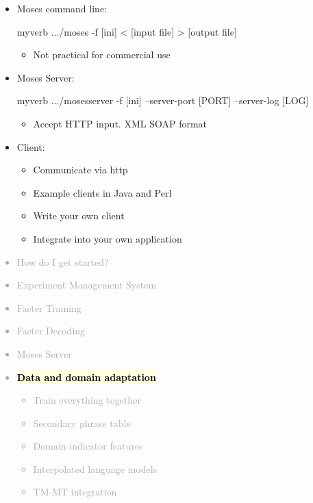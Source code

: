 \documentclass[landscape]{uedslides2C}
\newcommand{\currenttopic}[1]{\colorbox{lightyellow}{\textcolor{black}{\bf #1}}}
\begin{document}
\begin{itemize} \itemsep -1mm
\item Moses command line:\\[3mm]
\begin{SaveVerbatim}{myverb} 
  .../moses -f [ini] < [input file] > [output file]
\end{SaveVerbatim}
\colorbox{gray}{}
    \begin{itemize}
      \item Not practical for commercial use
    \end{itemize}


\item Moses Server:\\[3mm]
    \begin{SaveVerbatim}{myverb} 
 .../mosesserver -f [ini] --server-port [PORT] --server-log [LOG]
    \end{SaveVerbatim}
    \colorbox{gray}{}
    \begin{itemize}
      \item Accept HTTP input. XML SOAP format
    \end{itemize}

\item Client:
    \begin{itemize}
      \item Communicate via http
      \item Example clients in Java and Perl
      \item Write your own client
      \item Integrate into your own application
    \end{itemize}
    
\end{itemize}


\normalsize
\vspace{-5mm}
\textcolor{darkgrey}{
\begin{itemize} \itemsep -1mm
\item {How do I get started?}
\item {Experiment Management System}
\item {Faster Training}
\item {Faster Decoding}
\item {Moses Server}
\item \currenttopic{Data and domain adaptation}
  \begin{itemize}\vspace{-4mm}
  \item Train everything together
  \item Secondary phrase table
\item Domain indicator features
\item Interpolated language models
  \item TM-MT integration
  \end{itemize}
\end{itemize}
}
\end{document}
